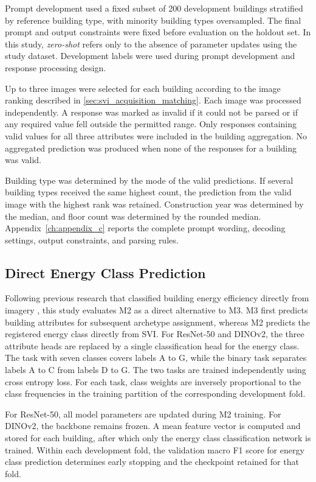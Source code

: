 Prompt development used a fixed subset of 200 development buildings stratified by reference building type, with minority building types oversampled.
The final prompt and output constraints were fixed before evaluation on the holdout set.
In this study, \emph{zero-shot} refers only to the absence of parameter updates using the study dataset.
Development labels were used during prompt development and response processing design.

Up to three images were selected for each building according to the image ranking described in \cref{sec:svi_acquisition_matching}.
Each image was processed independently.
A response was marked as invalid if it could not be parsed or if any required value fell outside the permitted range.
Only responses containing valid values for all three attributes were included in the building aggregation.
No aggregated prediction was produced when none of the responses for a building was valid.

Building type was determined by the mode of the valid predictions.
If several building types received the same highest count, the prediction from the valid image with the highest rank was retained.
Construction year was determined by the median, and floor count was determined by the rounded median.
Appendix~\ref{ch:appendix_c} reports the complete prompt wording, decoding settings, output constraints, and parsing rules.

\subsection{Direct Energy Class Prediction}
\label{sec:direct_energy_class_prediction}

Following previous research that classified building energy efficiency directly from imagery \parencite{mayer2023uk,mayer2023dk}, this study evaluates M2 as a direct alternative to M3.
M3 first predicts building attributes for subsequent archetype assignment, whereas M2 predicts the registered energy class directly from \ac{SVI}.
For ResNet-50 and DINOv2, the three attribute heads are replaced by a single classification head for the energy class.
The task with seven classes covers labels A to G, while the binary task separates labels A to C from labels D to G.
The two tasks are trained independently using cross entropy loss.
For each task, class weights are inversely proportional to the class frequencies in the training partition of the corresponding development fold.

For ResNet-50, all model parameters are updated during M2 training.
For DINOv2, the backbone remains frozen.
A mean feature vector is computed and stored for each building, after which only the energy class classification network is trained.
Within each development fold, the validation macro F1 score for energy class prediction determines early stopping and the checkpoint retained for that fold.

